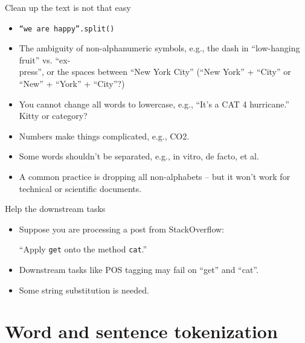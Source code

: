 \documentclass[11pt, handout]{beamer}
\begin{document}
\begin{frame}{Clean up the text is not that easy}
 \begin{itemize}
  \item \texttt{``we are happy''.split()} 
  \item The ambiguity of non-alphanumeric symbols, e.g., the dash in ``low-hanging fruit'' vs. ``ex-\\press'', or the spaces between ``New York City'' (``New York'' + ``City'' or ``New'' + ``York'' + ``City''?)
  \item You cannot change all words to lowercase, e.g., ``It's a CAT 4 hurricane.'' Kitty or category? 
  \item Numbers make things complicated, e.g., CO2. 
  \item Some words shouldn't be separated, e.g., in vitro, de facto, et al. 
  \item A common practice is dropping all non-alphabets -- but it won't work for technical or scientific documents. 
 \end{itemize}
\end{frame}

\begin{frame}{Help the downstream tasks}
 \begin{itemize}[<+->]
  \item Suppose you are processing a post from StackOverflow: 
  
``Apply \texttt{get} onto the method \texttt{cat}.'' 

 \item Downstream tasks like POS tagging may fail on ``get'' and ``cat''. 
 
 \item Some string substitution is needed. 
 \end{itemize}
\end{frame}


\section{Word and sentence tokenization}
\end{document}
